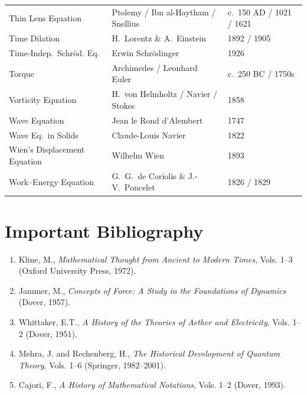\documentclass[11pt,openright]{book}
\begin{document}
\begin{longtable}{p{6cm}p{6cm}p{2.5cm}}
Thin Lens Equation & Ptolemy / Ibn al-Haytham / Snellius & c.\ 150 AD / 1021 / 1621 \\
Time Dilation & H.\ Lorentz \& A.\ Einstein & 1892 / 1905 \\
Time-Indep.\ Schr\"od. Eq. & Erwin Schr\"odinger & 1926 \\
Torque & Archimedes / Leonhard Euler & c.\ 250 BC / 1750s \\
Vorticity Equation & H.\ von Helmholtz / Navier / Stokes & 1858 \\
Wave Equation & Jean le Rond d'Alembert & 1747 \\
Wave Eq.\ in Solids & Claude-Louis Navier & 1822 \\
Wien's Displacement Equation & Wilhelm Wien & 1893 \\
Work--Energy Equation & G.\ G.\ de Coriolis \& J.-V.\ Poncelet & 1826 / 1829 \\
\end{longtable}

\section*{Important Bibliography}

\begin{enumerate}
\item Kline, M., \textit{Mathematical Thought from Ancient to Modern Times}, Vols. 1--3 (Oxford University Press, 1972).
\item Jammer, M., \textit{Concepts of Force: A Study in the Foundations of Dynamics} (Dover, 1957).
\item Whittaker, E.T., \textit{A History of the Theories of Aether and Electricity}, Vols. 1--2 (Dover, 1951).
\item Mehra, J. and Rechenberg, H., \textit{The Historical Development of Quantum Theory}, Vols. 1--6 (Springer, 1982--2001).
\item Cajori, F., \textit{A History of Mathematical Notations}, Vols. 1--2 (Dover, 1993).
\end{enumerate}
\end{document}
